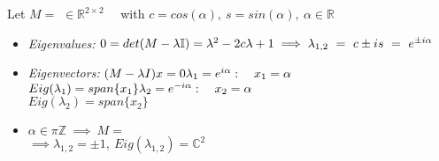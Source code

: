 \begin{SolutionSheet}[\ref{sheet1}]
  \begin{Solution}
    Let $M=$ $ \in \mathbb{R}^{2\times 2} \quad$ with $c = cos(\alpha), \ s = sin(\alpha), \ \alpha \in \mathbb{R}$ \\
    \begin{itemize}
      \item \textit{Eigenvalues:} $0 = det(M-\lambda \mathbb{I}) = \lambda^2 - 2c\lambda + 1 \\
        \implies \lambda_{1,2} \ = \ c \pm is \ = \ e^{\pm i\alpha}$ \\
      \item \textit{Eigenvectors:} $(M-\lambda I)x = 0 \\
        \lambda_1 = e^{i\alpha}: \quad x_1 = \alpha $  \\
        $Eig(\lambda_1) = span\{x_1\} \\
        \lambda_2 = e^{-i\alpha}: \quad x_2 = \alpha $ \\
        $Eig(\lambda_2) = span\{x_2\}$
      \item $\alpha \in \pi \mathbb{Z} \ \implies \ M=$  \\
        $\implies \lambda_{1,2} = \pm 1, \ Eig(\lambda_{1,2}) = \mathbb{C}^2$
    \end{itemize}
  \end{Solution}

  \begin{Solution}[Programming]
  \end{Solution}

\end{SolutionSheet}


